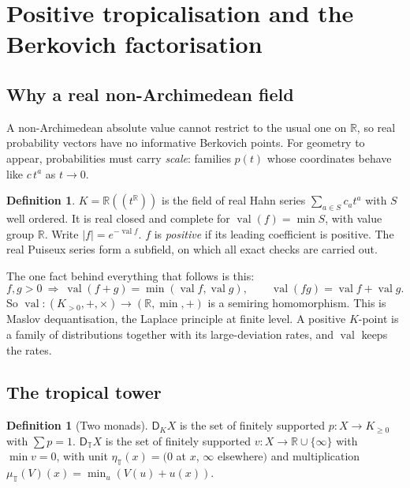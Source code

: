 \documentclass[11pt]{article}
\theoremstyle{definition}
\newtheorem{definition}[theorem]{Definition}
\newcommand{\DT}{\mathsf D_{\mathbb T}}
\newcommand{\DK}{\mathsf D_{K}}
\newcommand{\T}{\mathbb T}
\newcommand{\R}{\mathbb R}
\newcommand{\val}{\operatorname{val}}
\begin{document}
\section{Positive tropicalisation and the Berkovich factorisation}\label{sec:trop}

\subsection{Why a real non-Archimedean field}
A non-Archimedean absolute value cannot restrict to the usual one on $\R$, so real probability vectors have no informative Berkovich
points. For geometry to appear, probabilities must carry \emph{scale}: families $p(t)$ whose coordinates behave like $c\,t^a$ as
$t\to0$.

\begin{definition}
$K=\R((t^{\R}))$ is the field of real Hahn series $\sum_{a\in S}c_at^a$ with $S$ well ordered. It is real closed and complete for
$\val(f)=\min S$, with value group $\R$. Write $|f|=e^{-\val f}$. $f$ is \emph{positive} if its leading coefficient is positive. The
real Puiseux series form a subfield, on which all exact checks are carried out.
\end{definition}

The one fact behind everything that follows is this:
\begin{equation}\label{eq:nocancel}
f,g>0\ \Longrightarrow\ \val(f+g)=\min(\val f,\val g),\qquad\val(fg)=\val f+\val g .
\end{equation}
So $\val\colon(K_{>0},+,\times)\to(\R,\min,+)$ is a semiring homomorphism. This is Maslov dequantisation, the Laplace principle at
finite level. A positive $K$-point is a family of distributions together with its large-deviation rates, and $\val$ keeps the rates.

\subsection{The tropical tower}
\begin{definition}[Two monads]
$\DK X$ is the set of finitely supported $p\colon X\to K_{\ge0}$ with $\sum p=1$. $\DT X$ is the set of finitely supported
$v\colon X\to\R\cup\{\infty\}$ with $\min v=0$, with unit $\eta_\T(x)=(0$ at $x$, $\infty$ elsewhere$)$ and multiplication
$\mu_\T(V)(x)=\min_u(V(u)+u(x))$.
\end{definition}
\end{document}
